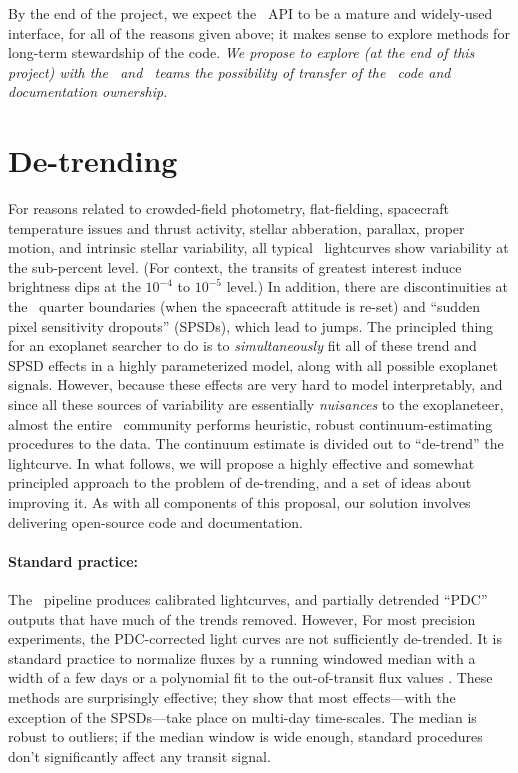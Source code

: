 \documentclass[letterpaper,12pt,preprint]{hack_aastex}
\newcommand{\kplr}{\package{kplr}}
\begin{document}
By the end of the project,
we expect the \kplr\ API to be a mature and widely-used interface,
for all of the reasons given above;
it makes sense to explore methods for long-term stewardship of the code.
\emph{We propose to explore (at the end of this project) with the \MAST\ and \EA\ teams the possibility of
transfer of the \kplr\ code and documentation ownership.}


\section{De-trending}

For reasons related to crowded-field photometry, flat-fielding,
spacecraft temperature issues and thrust activity, stellar abberation, parallax, proper motion,
and intrinsic stellar variability, all typical \Kepler\ lightcurves show
variability at the sub-percent level.
(For context, the transits of greatest interest induce brightness dips at the
$10^{-4}$ to $10^{-5}$ level.)
In addition,
there are discontinuities at the \Kepler\ quarter boundaries (when the
spacecraft attitude is re-set) and ``sudden pixel
sensitivity dropouts'' (SPSDs), which lead to jumps.
The principled thing for an exoplanet searcher to do is to \emph{simultaneously}
fit all of these trend and SPSD effects in a highly parameterized model,
along with all possible exoplanet signals.
However, because these effects are very hard to model interpretably, and since
all these sources of variability are essentially \emph{nuisances} to the
exoplaneteer, almost the entire \Kepler\ community performs heuristic, robust
continuum-estimating procedures to the data.
The continuum estimate is divided out to ``de-trend'' the lightcurve.
In what follows, we will propose a highly effective and somewhat principled
approach to the problem of de-trending, and a set of ideas about improving it.
As with all components of this proposal, our solution involves delivering
open-source code and documentation.

\paragraph{Standard practice:}
The \Kepler\ pipeline produces calibrated lightcurves, and partially
detrended ``PDC'' outputs that have much of the trends removed.
However, For most precision experiments, the PDC-corrected light curves
are not sufficiently de-trended.
It is standard practice to normalize fluxes by a
running windowed median with a width of a few days \citep{dressing} or a
polynomial fit to the out-of-transit flux values \citep[regions chosen by
hand;][]{autokep}.
These methods are surprisingly effective; they show that most effects---with
the exception of the SPSDs---take place on multi-day time-scales.
The median is robust to outliers; if the median window is
wide enough, standard procedures don't significantly affect any
transit signal.
\end{document}
